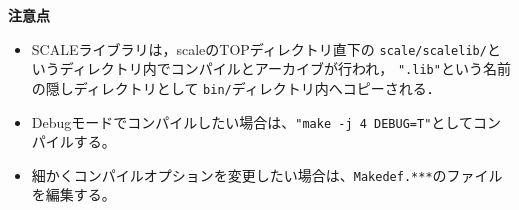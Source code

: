 {\bf 注意点}
\begin{itemize}
\item SCALEライブラリは，scaleのTOPディレクトリ直下の
 \verb|scale/scalelib/|というディレクトリ内でコンパイルとアーカイブが行われ，
 \verb|".lib"|という名前の隠しディレクトリとして
 \verb|bin/|ディレクトリ内へコピーされる．
\item Debugモードでコンパイルしたい場合は、\verb|"make -j 4 DEBUG=T"|としてコンパイルする。
\item 細かくコンパイルオプションを変更したい場合は、\verb|Makedef.***|のファイルを編集する。
\end{itemize}



